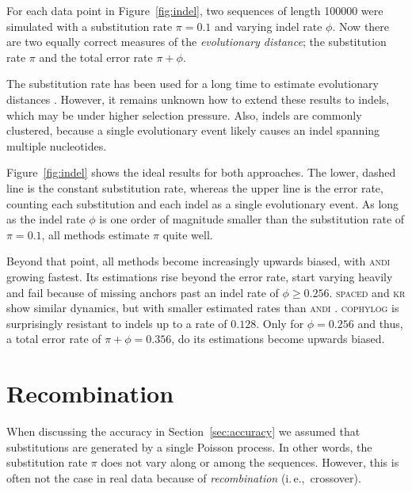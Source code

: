 \documentclass[a4paper,
  10pt,
  english,
  DIV=12,
  BCOR=8mm]{scrbook}
\newcommand{\algo}[1]{\textsc{{#1}}}
\newcommand{\andi}{\algo{andi} }
\begin{document}
For each data point in Figure~\ref{fig:indel}, two sequences of length \SI{100000}{\basepairs} were simulated with a substitution rate $\pi = 0.1$ and varying indel rate $\phi$. Now there are two equally correct measures of the \emph{evolutionary distance}; the substitution rate $\pi$ and the total error rate $\pi + \phi$.

The substitution rate has been used for a long time to estimate evolutionary distances \cite{Zuckerkandl}. However, it remains unknown how to extend these results to indels, which may be under higher selection pressure. Also, indels are commonly clustered, because a single evolutionary event likely causes an indel spanning multiple nucleotides.%

Figure~\ref{fig:indel} shows the ideal results for both approaches. The lower, dashed line is the constant substitution rate, whereas the upper line is the error rate, counting each substitution and each indel as a single evolutionary event. As long as the indel rate $\phi$ is one order of magnitude smaller than the substitution rate of $\pi = 0.1$, all methods estimate $\pi$ quite well.

Beyond that point, all methods become increasingly upwards biased, with \andi growing fastest. Its estimations rise beyond the error rate, start varying heavily and fail because of missing anchors past an indel rate of $\phi \ge 0.256$. \algo{spaced} and \algo{kr} show similar dynamics, but with smaller estimated rates than \andi. \algo{cophylog} is surprisingly resistant to indels up to a rate of $0.128$. Only for $\phi = 0.256$ and thus, a total error rate of $\pi + \phi = 0.356$, do its estimations become upwards biased.

\section{Recombination} \label{sec:recomb}

When discussing the accuracy in Section~\ref{sec:accuracy} we assumed that substitutions are generated by a single Poisson process. In other words, the substitution rate $\pi$ does not vary along or among the sequences. However, this is often not the case in real data because of \emph{recombination} (i.\,e.,\ crossover).
\end{document}
